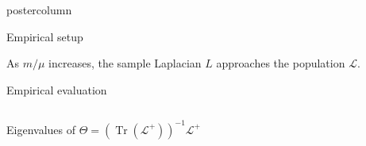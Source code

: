 \documentclass[final,hyperref={pdfpagelabels=false}]{beamer}
\DeclareMathOperator{\Tr}{Tr}
\begin{document}
\begin{frame}
\begin{columns}
\begin{column}{.49\textwidth}
\begin{beamercolorbox}[center,wd=\textwidth]{postercolumn}
\begin{minipage}[T]{.95\textwidth}
{\begin{block}{Empirical setup}
  \begin{center}
  \end{center}
  \vspace{-1em}

  As $m / \mu$ increases, the sample Laplacian $L$ approaches the
  population $\mathcal{L}$.

  
	    \end{block}

	    \vfill

            \begin{block}{Empirical evaluation}
\begin{columns}
  \begin{column}{.25\textwidth}
    \begin{center}
    {\tiny Eigenvalues of $\Theta = (\Tr(\mathcal{L^+}))^{-1} \mathcal{L^+}$}
    \vspace{-0.5em}

      

\end{center}
\end{column}
\end{columns}
\end{block}}
\end{minipage}
\end{beamercolorbox}
\end{column}
\end{columns}
\end{frame}
\end{document}

